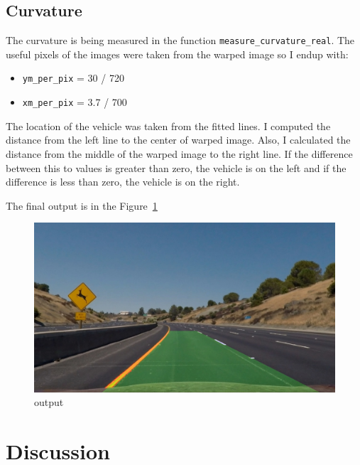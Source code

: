 \documentclass[11pt, a4paper]{article}
\begin{document}
\subsection{Curvature}%
\label{sub:curvature}

The curvature is being measured in the function \texttt{measure\_curvature\_real}. The useful pixels of the images were taken from the warped image so I endup with:

\begin{itemize}
	\item \texttt{ym\_per\_pix} = 30 / 720
	\item \texttt{xm\_per\_pix} = 3.7 / 700
\end{itemize}

The location of the vehicle was taken from the fitted lines. I computed the distance from the left line to the center of warped image. Also, I calculated the distance from the middle of the warped image to the right line. If the difference between this to values is greater than zero, the vehicle is on the left and if the difference is less than zero, the vehicle is on the right.



The final output is in the Figure~\ref{fig:output}

\begin{figure}[htb!]
	\centering
	\includegraphics[width=0.8\linewidth]{output}
	\caption{output}
	\label{fig:output}
\end{figure}








\section{Discussion}
\label{sec:discussion}
\end{document}
